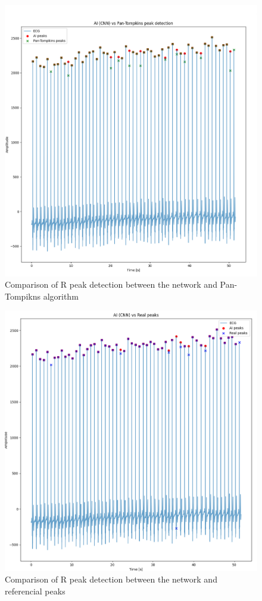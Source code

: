 \documentclass[journal]{IEEEtran}
\begin{document}
{\begin{figure}[htbp]
    \centering
    \includegraphics[scale=0.2]{ai_pan-tompkins.png}
    \caption{Comparison of R peak detection between the network and Pan-Tompikns algorithm}
    \label{fig:ai_pan-tompkins}
\end{figure}

\begin{figure}[htbp]
    \centering
    \includegraphics[scale=0.2]{ai_real_peaks.png}
    \caption{Comparison of R peak detection between the network and referencial peaks}
    \label{fig:ai_real_peaks}
\end{figure}


}
\end{document}
